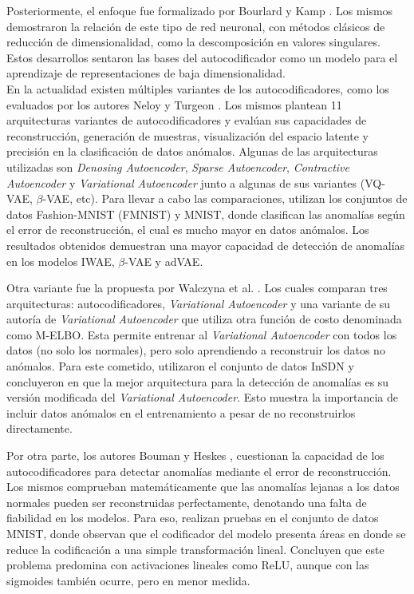 \documentclass[a4paper,10pt]{book}
\begin{document}
Posteriormente, el enfoque fue formalizado por Bourlard y Kamp \cite{bourlard1988auto}. Los mismos demostraron la relación de este tipo de red neuronal, con métodos clásicos de reducción de dimensionalidad, como la descomposición en valores singulares. Estos desarrollos sentaron las bases del autocodificador como un modelo para el aprendizaje de representaciones de baja dimensionalidad.\\

En la actualidad existen múltiples variantes de los autocodificadores, como los evaluados por los autores Neloy y Turgeon \cite{neloy2024comprehensive}. Los mismos plantean 11 arquitecturas variantes de autocodificadores y evalúan sus capacidades de reconstrucción, generación de muestras, visualización del espacio latente y precisión en la clasificación de datos anómalos. Algunas de las arquitecturas utilizadas son \emph{Denosing Autoencoder}, \emph{Sparse Autoencoder}, \emph{Contractive Autoencoder} y \emph{Variational Autoencoder} junto a algunas de sus variantes (VQ-VAE, $\beta$-VAE, etc). Para llevar a cabo las comparaciones, utilizan los conjuntos de datos Fashion-MNIST (FMNIST) y MNIST, donde clasifican las anomalías según el error de reconstrucción, el cual es mucho mayor en datos anómalos. Los resultados obtenidos demuestran una mayor capacidad de detección de anomalías en los modelos IWAE, $\beta$-VAE y adVAE.

Otra variante fue la propuesta por Walczyna et al. \cite{walczyna2024enhancing}. Los cuales comparan tres arquitecturas: autocodificadores, \emph{Variational Autoencoder} y una variante de su autoría de \emph{Variational Autoencoder} que utiliza otra función de costo denominada como M-ELBO. Esta permite entrenar al \emph{Variational Autoencoder} con todos los datos (no solo los normales), pero solo aprendiendo a reconstruir los datos no anómalos. Para este cometido, utilizaron el conjunto de datos InSDN y concluyeron en que la mejor arquitectura para la detección de anomalías es su versión modificada del \emph{Variational Autoencoder}. Esto muestra la importancia de incluir datos anómalos en el entrenamiento a pesar de no reconstruirlos directamente.

Por otra parte, los autores Bouman y Heskes \cite{bouman2025autoencoders}, cuestionan la capacidad de los autocodificadores para detectar anomalías mediante el error de reconstrucción. Los mismos comprueban matemáticamente que las anomalías lejanas a los datos normales pueden ser reconstruidas perfectamente, denotando una falta de fiabilidad en los modelos. Para eso, realizan pruebas en el conjunto de datos MNIST, donde observan que el codificador del modelo presenta áreas en donde se reduce la codificación a una simple transformación lineal. Concluyen que este problema predomina con activaciones lineales como ReLU, aunque con las sigmoides también ocurre, pero en menor medida.
 
\end{document}
